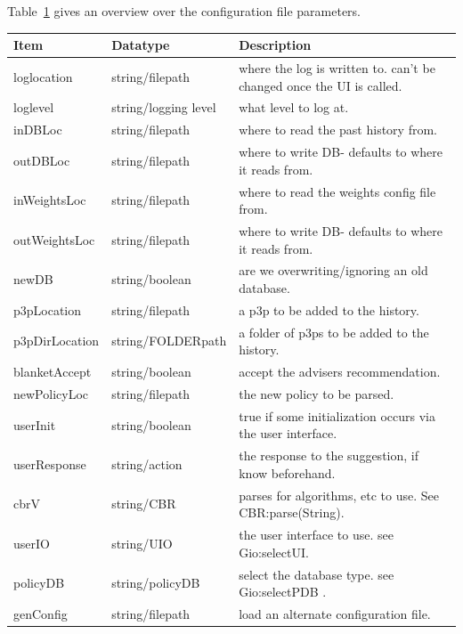Table~\ref{configTable} gives an overview over the configuration file parameters.

\begin{center}
  \begin{table}[h!]
    \label{configTable}
    \begin{tabular} { | l | l | p{7cm} | }
      \hline
      \textbf{Item} & \textbf{Datatype} & \textbf{Description} \\ \hline
      loglocation & string/filepath  & where the log is written to. can't be changed once the UI is  called. \\ \hline
      loglevel & string/logging level	& what level to log at. \\ \hline
      inDBLoc & string/filepath	& where to read the past history from. \\ \hline
      outDBLoc & string/filepath & where to write DB- defaults to where it reads from. \\ \hline
      inWeightsLoc& string/filepath & where to read the weights config file from. \\ \hline
      outWeightsLoc	& string/filepath & where to write DB- defaults to where it reads from. \\ \hline
      newDB & string/boolean & are we overwriting/ignoring an old database. \\ \hline
      p3pLocation & string/filepath & a p3p to be added to the history. \\ \hline
      p3pDirLocation	& string/FOLDERpath& a folder of p3ps to be added to the history. \\ \hline
      blanketAccept & string/boolean & accept the advisers recommendation. \\ \hline
      newPolicyLoc & string/filepath	& the new policy to be parsed. \\ \hline
      userInit & string/boolean	& true if some initialization occurs via the user interface. \\ \hline
      userResponse & string/action	& the response to the suggestion, if know beforehand. \\ \hline
      cbrV & string/CBR & parses for algorithms, etc to use. See CBR:parse(String). \\ \hline
      userIO & string/UIO	& the user interface to use. see Gio:selectUI. \\ \hline
      policyDB & string/policyDB & select the database type. see Gio:selectPDB . \\ \hline
      genConfig	& string/filepath & load an alternate configuration file. \\ \hline

\end{tabular}
\end{table}
\end{center}

